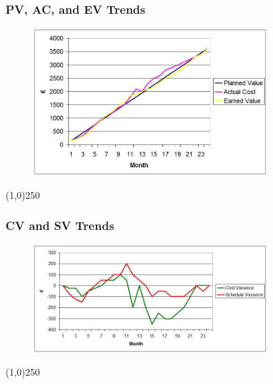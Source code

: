 \begin{frame}
\frametitle{PV, AC, and EV Trends}
\begin{figure}
	\centering
		\includegraphics[width = 9cm]{images/trendsgraph.jpg}
	\label{fig:trendsgraph}
\end{figure}
\end{frame}
\begin{center}\line(1,0){250}\end{center}






\begin{frame}
\frametitle{CV and SV Trends}
\begin{figure}
	\centering
		\includegraphics[width = 9cm]{images/cvtrends.jpg}
	\label{fig:cvtrends}
\end{figure}
\end{frame}
\begin{center}\line(1,0){250}\end{center}







